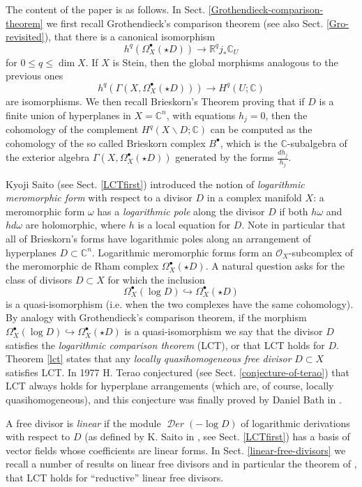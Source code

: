 \documentclass[12pt]{article}
\newcommand{\CC}{\mathbb{C}}
\newcommand{\RR}{\mathbb{R}}
\DeclareMathOperator{\fDer}{\mathcal{D}\mathit{er}}
\newcommand{\OO}{\mathcal{O}}
\newcommand{\cO}{\OO}
\newcommand\ssm{\smallsetminus}
\begin{document}
The content of the paper is as follows. In Sect. \ref{Grothendieck-comparison-theorem} we first recall Grothendieck's comparison theorem (see also Sect. \ref{Gro-revisited}), that there is a canonical isomorphism
$$h^q(\Omega_X^\bullet(\star D)) \rightarrow \RR^q j_* \CC_{U}$$ for $0\leq q \leq \dim X$. If $X$ is Stein, then the global morphisms analogous to the previous ones $$h^q(\Gamma(X,\Omega_X^\bullet(\star D))) \rightarrow H^q(U; \CC)$$  are isomorphisms. We then recall Brieskorn's Theorem proving that if $D$ is a finite union of hyperplanes in $X=\CC^n$, with equations $h_j=0$, then the cohomology of the complement $H^q(X\ssm D;\CC)$ can be computed as the cohomology of the so called Brieskorn complex $B^\bullet$, which is the $\CC$-subalgebra of the exterior algebra $\Gamma(X,\Omega_X^\bullet(\star D))$ generated by the forms $\frac{dh_j}{h_j}$.

Kyoji Saito (see Sect. \ref{LCTfirst}) introduced the notion of {\em logarithmic meromorphic form} with respect to a divisor $D$ in a complex manifold $X$: a meromorphic form $\omega$ has a {\it logarithmic pole} along the divisor $D$ if both $h\omega$ and $hd\omega$ are holomorphic, where $h$ is a local equation for $D$. Note in particular that all of Brieskorn's forms have logarithmic poles along an arrangement of hyperplanes $D\subset \CC^n$. Logarithmic meromorphic forms form an $\cO_X$-subcomplex of the meromorphic de Rham complex $\Omega_X^\bullet(\star D)$. A natural question asks for the class of divisors $D\subset X$ for which the inclusion $$ \Omega_X^\bullet(\log D) \hookrightarrow \Omega_X^\bullet(\star D)$$ is a quasi-isomorphism (i.e. when the two complexes have the same cohomology). By analogy with Grothendieck's comparison theorem, if the morphism $ \Omega_X^\bullet(\log D) \hookrightarrow \Omega_X^\bullet(\star D)$  is a quasi-isomorphism we say that the divisor $D$ satisfies the {\em logarithmic comparison theorem} (LCT), or that LCT holds for $D$. Theorem \ref{lct} states that any {\em locally quasihomogeneous free divisor} $D \subset X$ satisfies LCT. In 1977 H. Terao conjectured (see Sect. \ref{conjecture-of-terao}) that LCT always holds for hyperplane arrangements (which are, of course, locally quasihomogeneous), and this conjecture was finally proved by Daniel Bath in \cite{Bath2022}.

A free divisor is {\em linear} if the module $\fDer(-\log D)$ of logarithmic derivations with respect to $D$ (as defined by K. Saito in \cite{Saito-80}, see Sect. \ref{LCTfirst}) has a basis of vector fields whose coefficients are linear forms. In Sect. \ref{linear-free-divisors} we recall a number of results on linear free divisors and in particular the theorem of \cite{gmns}, that LCT holds for ``reductive'' linear free divisors.
\end{document}
